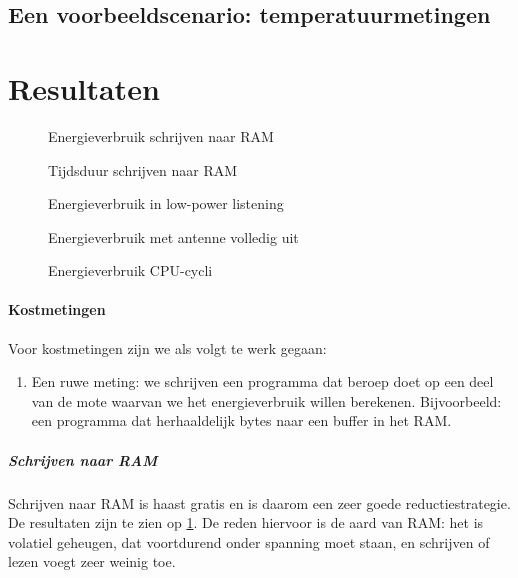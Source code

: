 \documentclass{article}
\begin{document}
\subsection{Een voorbeeldscenario: temperatuurmetingen}

\section{Resultaten}

\begin{figure}[h]
\centering
\missingfigure{}
\caption{Energieverbruik schrijven naar RAM}
\label{fig:energieverbruik_ram}
\end{figure}

\begin{figure}[h]
\centering
\missingfigure{}
\caption{Tijdsduur schrijven naar RAM}
\label{fig:tijdsduur_ram}
\end{figure}

\begin{figure}[h]
\centering
\missingfigure{}
\caption{Energieverbruik in low-power listening}
\label{fig:energieverbruik_low_power}
\end{figure}

\begin{figure}[h]
\centering
\missingfigure{}
\caption{Energieverbruik met antenne volledig uit}
\label{fig:energieverbruik_antenne_uit}
\end{figure}

\begin{figure}[h]
\centering
\missingfigure{}
\caption{Energieverbruik CPU-cycli}
\label{fig:energieverbruik_cpu}
\end{figure}

\paragraph{Kostmetingen}

Voor kostmetingen zijn we als volgt te werk gegaan:

\begin{enumerate}
\item Een ruwe meting: we schrijven een programma dat beroep doet op een deel
van de mote waarvan we het energieverbruik willen berekenen. Bijvoorbeeld: een
programma dat herhaaldelijk bytes naar een buffer in het RAM. 
\end{enumerate}

\subparagraph{Schrijven naar RAM}

Schrijven naar RAM is haast gratis en is daarom een zeer goede
reductiestrategie. De resultaten zijn te zien op
\ref{fig:energieverbruik_ram}. De reden hiervoor is de aard van RAM: het is
volatiel geheugen, dat voortdurend onder spanning moet staan, en schrijven of
lezen voegt zeer weinig toe.
\end{document}
